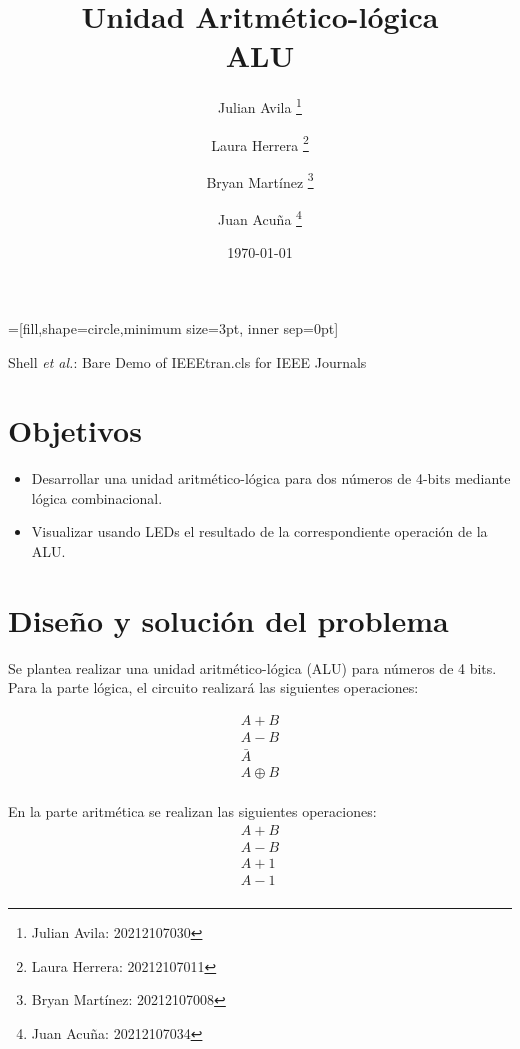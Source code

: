 \documentclass[journal, table]{IEEEtran}
\begin{document}
=[fill,shape=circle,minimum size=3pt, inner sep=0pt]

\title{\textbf{Unidad Aritmético-lógica} \\ \small{ALU}}

\author[*]{Julian Avila
    \thanks{Julian Avila: 20212107030}}
\author[*]{Laura Herrera
    \thanks{Laura Herrera: 20212107011}}
\author[*]{Bryan Martínez
    \thanks{Bryan Martínez: 20212107008}}
\author[*]{Juan Acuña
    \thanks{Juan Acuña: 20212107034}}


\date{\today}

\markboth{}
{Shell \MakeLowercase{\textit{et al.}}: Bare Demo of IEEEtran.cls for IEEE Journals}

\maketitle

\section{Objetivos}
\begin{itemize}
    \item Desarrollar una unidad aritmético-lógica para dos números de 4-bits mediante lógica combinacional.
     \item Visualizar usando LEDs el resultado de la correspondiente operación de la ALU.
\end{itemize}

\section{Diseño y solución del problema}
Se plantea realizar una unidad aritmético-lógica (ALU) para números de 4 bits. Para la parte lógica, el circuito realizará las siguientes operaciones:

\begin{align}
A+B \\
A-B \\
\bar{A} \\
A \oplus B \\
\end{align}

En la parte aritmética se realizan las siguientes operaciones:
\begin{align}
A+B \\
A-B \\
A+1 \\
A-1 \\
\end{align}
\end{document}
